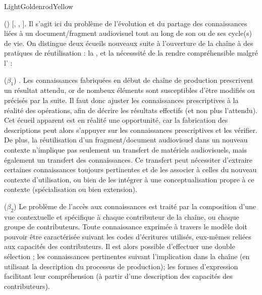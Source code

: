 \begin{problemes}{LightGoldenrodYellow}
\begin{liste}
 	\item[(\g{$\beta$})]  [, , ].
 	Il s'agit ici du problème de l'évolution et du partage des connaissances liées à un document/fragment audiovisuel tout au long de son ou de ses cycle(s) de vie. 
 	On distingue deux écueils nouveaux suite à l'ouverture de la chaîne à des pratiques de réutilisation : la , et la nécesssité de la rendre compréhensible malgré l' : 
 	\begin{listeni}
 		\item[($\beta_1$)] .
 		Les connaissances fabriquées en début de chaîne de production prescrivent un résultat attendu, or de nombeux éléments sont susceptibles d'être modifiés ou précisés par la suite.
 		Il faut donc ajuster les connaissances prescriptives à la réalité des opérations, afin de décrire les résultats effectifs (et non plus l'attendu).
 		Cet écueil apparent est en réalité une opportunité, car la fabrication des descriptions peut alors s'appuyer sur les connaissances prescriptives et les vérifier. 
		De plus, la réutilisation d'un fragment/document audiovisuel dans un nouveau contexte n'implique pas seulement un transfert de matériels audiovisuels, mais également un transfert des connaissances. %
		Ce transfert peut nécessiter d'extraire certaines connaissances toujours pertinentes et de les associer à celles du nouveau contexte d'utilisation, ou bien de les intégrer à une conceptualisation propre à ce contexte (spécialisation ou bien extension).

		\item[($\beta_2$)] 
 		Le problème de l'accès aux connaissances est traité par la composition d'une vue contextuelle et spécifique à chaque contributeur de la chaîne, ou chaque groupe de contributeurs.
 		Toute connaissance exprimée à travers le modèle doit pouvoir être caractérisée suivant les codes d'écritures utilisés, eux-mêmes reliées aux capacités des contributeurs.
		Il est alors possible d'effectuer une double sélection ; les connaissances pertinentes suivant l'implication dans la chaîne (en utilisant la description du processus de production); les formes d'expression facilitant leur compréhension (à partir d'une description des capacités des contributeurs).
 	\end{listeni}
\end{liste}
\end{problemes}


